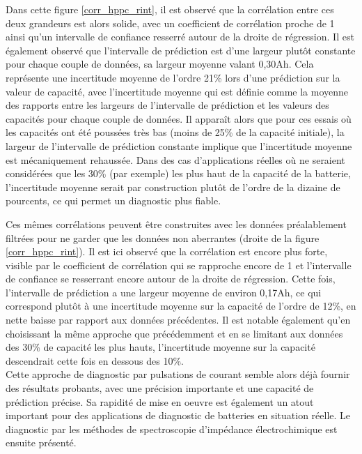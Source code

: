 Dans cette figure \ref{corr_hppc_rint}, il est observé que la corrélation entre ces deux grandeurs est alors solide, avec un coefficient de corrélation proche de 1 ainsi qu'un intervalle de confiance resserré autour de la droite de régression. Il est également observé que l'intervalle de prédiction est d'une largeur plutôt constante pour chaque couple de données, sa largeur moyenne valant 0,30Ah. Cela représente une incertitude moyenne de l'ordre 21\% lors d'une prédiction sur la valeur de capacité, avec l'incertitude moyenne qui est définie comme la moyenne des rapports entre les largeurs de l'intervalle de prédiction et les valeurs des capacités pour chaque couple de données. Il apparaît alors que pour ces essais où les capacités ont été poussées très bas (moins de 25\% de la capacité initiale), la largeur de l'intervalle de prédiction constante implique que l'incertitude moyenne est mécaniquement rehaussée. Dans des cas d'applications réelles où ne seraient considérées que les 30\% (par exemple) les plus haut de la capacité de la batterie, l'incertitude moyenne serait par construction plutôt de l'ordre de la dizaine de pourcents, ce qui permet un diagnostic plus fiable.
    
Ces mêmes corrélations peuvent être construites avec les données préalablement filtrées pour ne garder que les données non aberrantes (droite de la figure \ref{corr_hppc_rint}). Il est ici observé que la corrélation est encore plus forte, visible par le coefficient de corrélation qui se rapproche encore de 1 et l'intervalle de confiance se resserrant encore autour de la droite de régression. Cette fois, l'intervalle de prédiction a une largeur moyenne de environ 0,17Ah, ce qui correspond plutôt à une incertitude moyenne sur la capacité de l'ordre de 12\%, en nette baisse par rapport aux données précédentes. Il est notable également qu'en choisissant la même approche que précédemment et en se limitant aux données des 30\% de capacité les plus hauts, l'incertitude moyenne sur la capacité descendrait cette fois en dessous des 10\%. \\ \newline
Cette approche de diagnostic par pulsations de courant semble alors déjà fournir des résultats probants, avec une précision importante et une capacité de prédiction précise. Sa rapidité de mise en oeuvre est également un atout important pour des applications de diagnostic de batteries en situation réelle. Le diagnostic par les méthodes de spectroscopie d'impédance électrochimique est ensuite présenté.


